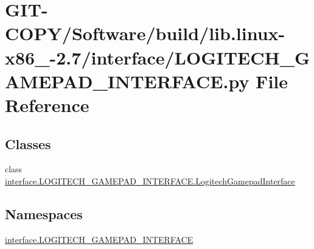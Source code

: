 \hypertarget{GIT-COPY_2Software_2build_2lib_8linux-x86__64-2_87_2interface_2LOGITECH__GAMEPAD__INTERFACE_8py}{}\section{G\+I\+T-\/\+C\+O\+P\+Y/\+Software/build/lib.linux-\/x86\+\_-\/2.7/interface/\+L\+O\+G\+I\+T\+E\+C\+H\+\_\+\+G\+A\+M\+E\+P\+A\+D\+\_\+\+I\+N\+T\+E\+R\+F\+A\+C\+E.py File Reference}
\label{GIT-COPY_2Software_2build_2lib_8linux-x86__64-2_87_2interface_2LOGITECH__GAMEPAD__INTERFACE_8py}
\subsection*{Classes}
\begin{DoxyCompactItemize}
\item 
class \hyperlink{classinterface_1_1LOGITECH__GAMEPAD__INTERFACE_1_1LogitechGamepadInterface}{interface.\+L\+O\+G\+I\+T\+E\+C\+H\+\_\+\+G\+A\+M\+E\+P\+A\+D\+\_\+\+I\+N\+T\+E\+R\+F\+A\+C\+E.\+Logitech\+Gamepad\+Interface}
\end{DoxyCompactItemize}
\subsection*{Namespaces}
\begin{DoxyCompactItemize}
\item 
 \hyperlink{namespaceinterface_1_1LOGITECH__GAMEPAD__INTERFACE}{interface.\+L\+O\+G\+I\+T\+E\+C\+H\+\_\+\+G\+A\+M\+E\+P\+A\+D\+\_\+\+I\+N\+T\+E\+R\+F\+A\+C\+E}
\end{DoxyCompactItemize}
